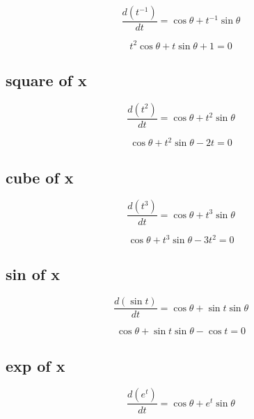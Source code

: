 \documentclass{article}
\begin{document}
\begin{equation}
    \frac{d(t^{-1})}{dt} = \cos \theta + t^{-1} \sin \theta
\end{equation}

\begin{equation}
    t^2 \cos \theta + t \sin \theta + 1 = 0
\end{equation}

\subsection{square of x}

\begin{equation}
    \frac{d(t^2)}{dt} = \cos \theta + t^2 \sin \theta
\end{equation}

\begin{equation}
    \cos \theta + t^2 \sin \theta - 2 t = 0
\end{equation}

\subsection{cube of x}

\begin{equation}
    \frac{d(t^3)}{dt} = \cos \theta + t^3 \sin \theta
\end{equation}

\begin{equation}
    \cos \theta + t^3 \sin \theta - 3 t^2 = 0
\end{equation}

\subsection{sin of x}

\begin{equation}
    \frac{d(\sin t)}{dt} = \cos \theta + \sin t \sin \theta
\end{equation}

\begin{equation}
     \cos \theta + \sin t \sin \theta - \cos t = 0
\end{equation}

\subsection{exp of x}

\begin{equation}
    \frac{d(e^t)}{dt} = \cos \theta + e^t \sin \theta
\end{equation}
\end{document}
